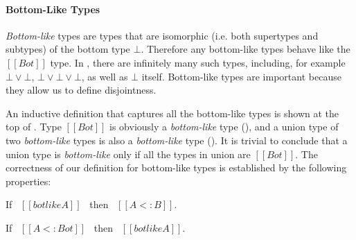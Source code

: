 \paragraph{Bottom-Like Types}
\emph{Bottom-like} types are types that are isomorphic (i.e.
both supertypes and subtypes) of the bottom type $\bot$. Therefore
any bottom-like types behave like the $[[Bot]]$ type.
In \name, there
are infinitely many such types, including, for example $\bot \lor \bot$,
$\bot \lor \bot \lor \bot$, as well as $\bot$ itself. Bottom-like types
are important because they allow us to define disjointness.

An inductive definition that captures all the bottom-like types
is shown at the top of .
Type $[[Bot]]$ is obviously a \emph{bottom-like} type
(), and a union type of two \emph{bottom-like} types is also
a \emph{bottom-like} type ().  It is trivial to conclude
that a union type is \emph{bottom-like} only if all the 
types in union are $[[Bot]]$. The correctness of our definition for
bottom-like types is established by the following properties:

\begin{lemma}
  If \ $[[botlike A]]$ \ then \ $[[A <: B]]$.
\label{lemma:union:bl-soundness}
\end{lemma}

\begin{comment}
\begin{proof}
  By induction on bottom-like relation.
  \begin{itemize}
    \item All cases are trivial to prove.
  \end{itemize}
\end{proof}
\end{comment}

\begin{lemma}
  If \ $[[A <: Bot]]$ \ then \ $[[botlike A]]$.
\label{lemma:union:bl-completeness}
\end{lemma}

